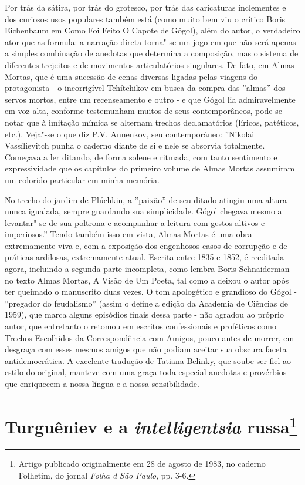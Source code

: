 Por trás da sátira, por trás do grotesco, por trás das caricaturas
inclementes e dos curiosos usos populares também está (como muito bem
viu o crítico Boris Eichenbaum em Como Foi Feito O Capote de Gógol),
além do autor, o verdadeiro ator que as formula: a narração direta
torna"-se um jogo em que não será apenas a simples combinação de anedotas
que determina a composição, mas o sistema de diferentes trejeitos e de
movimentos articulatórios singulares. De fato, em Almas Mortas, que é
uma sucessão de cenas diversas ligadas pelas viagens do protagonista - o
incorrigível Tchítchikov em busca da compra das ''almas'' dos servos
mortos, entre um recenseamento e outro - e que Gógol lia admiravelmente
em voz alta, conforme testemunham muitos de seus contemporâneos, pode se
notar que à imitação mímica se alternam trechos declamatórios (líricos,
patéticos, etc.). Veja"-se o que diz P.V. Annenkov, seu contemporâneo:
''Nikolai Vassílievitch punha o caderno diante de si e nele se absorvia
totalmente. Começava a ler ditando, de forma solene e ritmada, com tanto
sentimento e expressividade que os capítulos do primeiro volume de Almas
Mortas assumiram um colorido particular em minha memória.

No trecho do jardim de Plúchkin, a ''paixão'' de seu ditado atingiu uma
altura nunca igualada, sempre guardando sua simplicidade. Gógol chegava
mesmo a levantar"-se de sua poltrona e acompanhar a leitura com gestos
altivos e imperiosos.'' Tendo também isso em vista, Almas Mortas é uma
obra extremamente viva e, com a exposição dos engenhosos casos de
corrupção e de práticas ardilosas, extremamente atual. Escrita entre
1835 e 1852, é reeditada agora, incluindo a segunda parte incompleta,
como lembra Boris Schnaiderman no texto Almas Mortas, A Visão de Um
Poeta, tal como a deixou o autor após ter queimado o manuscrito duas
vezes. O tom apologético e grandioso do Gógol - ''pregador do
feudalismo'' (assim o define a edição da Academia de Ciências de 1959),
que marca alguns episódios finais dessa parte - não agradou ao próprio
autor, que entretanto o retomou em escritos confessionais e proféticos
como Trechos Escolhidos da Correspondência com Amigos, pouco antes de
morrer, em desgraça com esses mesmos amigos que não podiam aceitar sua
obscura faceta antidemocrática. A excelente tradução de Tatiana Belinky,
que soube ser fiel ao estilo do original, manteve com uma graça toda
especial anedotas e provérbios que enriquecem a nossa língua e a nossa
sensibilidade.

\chapter{Turguêniev e a \emph{intelligentsia} russa\footnote{Artigo
  publicado originalmente em 28 de agosto de 1983, no caderno Folhetim,
  do jornal \emph{Folha d São Paulo}, pp. 3-6.}}

